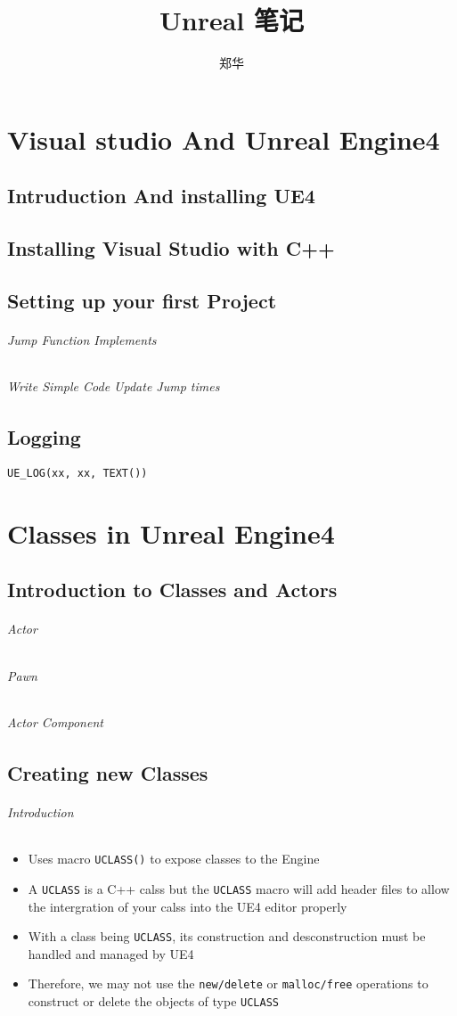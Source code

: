 \documentclass[UTF8,a4paper,12pt]{ctexbook}
\author{\kaishu 郑华}
\title{\heiti Unreal 笔记}
\begin{document}
 	\maketitle
 	\tableofcontents
 	
 
 

\chapter{Visual studio And Unreal Engine4}
	\section{Intruduction And installing UE4}
		
	\section{Installing Visual Studio with C++}
		
	\section{Setting up your first Project}
		\subparagraph{Jump Function Implements}
						
		\subparagraph{Write Simple Code Update Jump times}
	
	\section{Logging}
		
			\verb|UE_LOG(xx, xx, TEXT())|	
	
	
\chapter{Classes in Unreal Engine4}
	\section{Introduction to Classes and Actors}
		\subparagraph{Actor}
			
		\subparagraph{Pawn}
			
		\subparagraph{Actor Component}
			
			
	\section{Creating new Classes}
		\subparagraph{Introduction}
			\begin{itemize}[itemindent = 2em]
				\item Uses macro \verb|UCLASS()| to expose classes to the Engine
				\item A \verb|UCLASS| is a C++ calss but the \verb|UCLASS| macro will add header files to allow the intergration of your calss into the UE4 editor properly
				\item With a class being \verb|UCLASS|, its construction and desconstruction must be handled and managed by UE4
				\item Therefore, we may not use the \verb|new/delete| or \verb|malloc/free| operations to construct or delete the objects of type \verb|UCLASS|
			\end{itemize}
			
\end{document}
